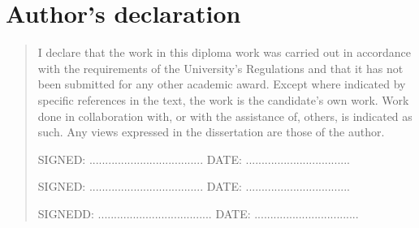 %
%
\chapter{Author's declaration}
\begin{SingleSpace}
\begin{quote}
I declare that the work in this diploma work was carried out in accordance with the requirements of the University's Regulations and that it  has not been submitted for any other academic award. Except where indicated by specific references in the text, the work is the candidate's own work. Work done in collaboration with, or with the assistance of, others, is indicated as such. Any views expressed in the dissertation are those of the author.

\vspace{1.5cm}
\noindent
\hspace{-0.75cm}\textsc{SIGNED: .................................... \hfill DATE: .................................}
\vspace{1.5cm}
\noindent

\hspace{-0.75cm}\textsc{SIGNED: .................................... \hfill DATE: .................................}

\vspace{1.5cm}
\noindent

\hspace{-0.75cm}\textsc{SIGNEDD: .................................... \hfill DATE: .................................}

\end{quote}
\end{SingleSpace}
